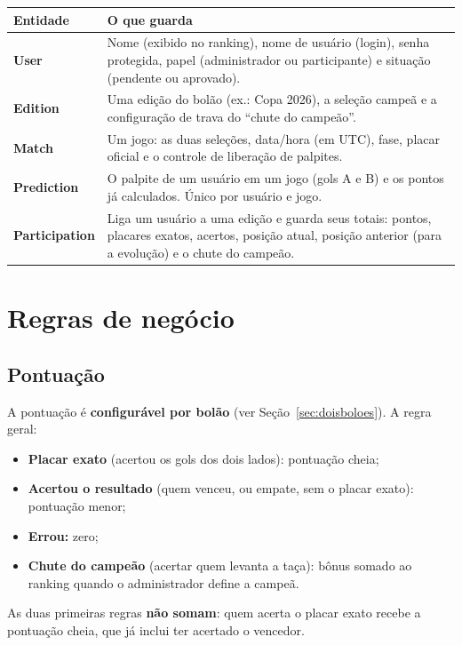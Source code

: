 \documentclass[11pt,a4paper]{article}
\begin{document}
\begin{center}
\begin{tabularx}{\textwidth}{@{}>{\bfseries}p{2.8cm} L@{}}
\toprule
Entidade & O que guarda \\
\midrule
User & Nome (exibido no ranking), nome de usuário (login), senha protegida,
papel (administrador ou participante) e situação (pendente ou aprovado). \\[4pt]
Edition & Uma edição do bolão (ex.: Copa 2026), a seleção campeã e a
configuração de trava do ``chute do campeão''. \\[4pt]
Match & Um jogo: as duas seleções, data/hora (em UTC), fase, placar oficial e
o controle de liberação de palpites. \\[4pt]
Prediction & O palpite de um usuário em um jogo (gols A e B) e os pontos já
calculados. Único por usuário e jogo. \\[4pt]
Participation & Liga um usuário a uma edição e guarda seus totais: pontos,
placares exatos, acertos, posição atual, posição anterior (para a evolução) e
o chute do campeão. \\
\bottomrule
\end{tabularx}
\end{center}

\section{Regras de negócio}

\subsection{Pontuação}
A pontuação é \textbf{configurável por bolão} (ver Seção~\ref{sec:doisboloes}).
A regra geral:

\begin{itemize}
  \item \textbf{Placar exato} (acertou os gols dos dois lados): pontuação cheia;
  \item \textbf{Acertou o resultado} (quem venceu, ou empate, sem o placar
  exato): pontuação menor;
  \item \textbf{Errou:} zero;
  \item \textbf{Chute do campeão} (acertar quem levanta a taça): bônus
  somado ao ranking quando o administrador define a campeã.
\end{itemize}

As duas primeiras regras \textbf{não somam}: quem acerta o placar exato recebe
a pontuação cheia, que já inclui ter acertado o vencedor.
\end{document}

